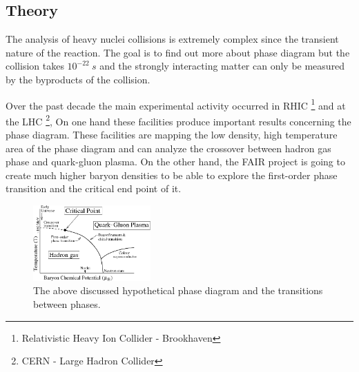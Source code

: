 \documentclass[a4paper,12pt]{article}
\begin{document}
\subsection{Theory}
\vspace{3mm}
\par The analysis of heavy nuclei collisions is extremely complex since the transient nature of the reaction. The goal is to find out more about phase diagram but the collision takes $10^{-22}~s$ and the strongly interacting matter can only be measured by the byproducts of the collision.
\par Over the past decade the main experimental activity occurred in RHIC \footnote{ Relativistic Heavy Ion Collider - Brookhaven } and at the LHC \footnote{ CERN - Large Hadron Collider }, On one hand these facilities produce important results concerning the phase diagram. These facilities are mapping the low density, high temperature area of the phase diagram and can analyze the crossover between hadron gas phase and quark-gluon plasma. On the other hand, the FAIR project is going to create much higher baryon densities to be able to explore the first-order phase transition and the critical end point of it.
\begin{figure}[H]
	\centering
	\includegraphics[width=0.40\textwidth]{CBM_phase_trans.png}
	\caption{ The above discussed hypothetical phase diagram and the transitions between phases. }
\end{figure}
\end{document}
